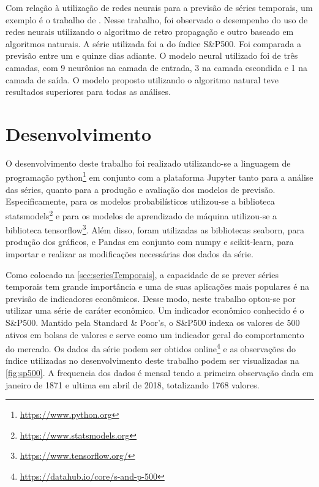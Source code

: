 \documentclass[
    12pt,
    oneside,
    a4paper,
    english,
    brazil
]{abntex2}
\begin{document}
Com relação à utilização de redes  neurais para a previsão de séries temporais,
um exemplo é o trabalho de . Nesse trabalho, foi observado
o desempenho do uso de redes neurais utilizando o algoritmo de retro propagação
e  outro baseado  em algoritmos  naturais. A  série utilizada  foi a  do índice
S\&P500. Foi  comparada a  previsão entre  um e quinze  dias adiante.  O modelo
neural utilizado foi de  três camadas, com 9 neurônios na  camada de entrada, 3
na camada  escondida e  1 na camada  de saída. O  modelo proposto  utilizando o
algoritmo natural teve resultados superiores para todas as análises.

\chapter{Desenvolvimento}\label{chap:desenv}

O   desenvolvimento    deste   trabalho    foi   realizado    utilizando-se   a
linguagem   de  programação   python\footnote{\url{https://www.python.org}}  em
conjunto  com   a  plataforma  Jupyter   tanto  para  a  análise   das  séries,
quanto   para   a    produção   e   avaliação   dos    modelos   de   previsão.
Especificamente,    para    os    modelos   probabilísticos    utilizou-se    a
biblioteca   statsmodels\footnote{\url{https://www.statsmodels.org}}   e   para
os   modelos    de   aprendizado   de   máquina    utilizou-se   a   biblioteca
tensorflow\footnote{\url{https://www.tensorflow.org/}}.   Além   disso,   foram
utilizadas  as bibliotecas  seaborn, para  produção dos  gráficos, e  Pandas em
conjunto com  numpy e  scikit-learn, para importar  e realizar  as modificações
necessárias dos dados da série.

Como  colocado  na \autoref{sec:seriesTemporais},  a  capacidade  de se  prever
séries  temporais  tem  grande  importância  e  uma  de  suas  aplicações  mais
populares é na  previsão de indicadores econômicos. Desse  modo, neste trabalho
optou-se por  utilizar uma série  de caráter econômico. Um  indicador econômico
conhecido é  o S\&P500. Mantido  pela Standard \&  Poor's, o S\&P500  indexa os
valores  de  500  ativos  em  bolsas  de valores  e  serve  como  um  indicador
geral  do  comportamento do  mercado.  Os  dados  da  série podem  ser  obtidos
online\footnote{\url{https://datahub.io/core/s-and-p-500}} e  as observações do
índice  utilizadas no  desenvolvimento  deste trabalho  podem ser  visualizadas
na  \autoref{fig:sp500}. A  frequencia  dos  dados é  mensal  tendo a  primeira
observação dada em janeiro de 1871 e  ultima em abril de 2018, totalizando 1768
valores.
\end{document}
